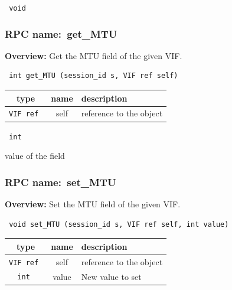 \vspace{0.3cm}

{\tt 
void
}



\vspace{0.3cm}
\vspace{0.3cm}
\vspace{0.3cm}
\subsubsection{RPC name:~get\_MTU}

{\bf Overview:} 
Get the MTU field of the given VIF.

\begin{verbatim} int get_MTU (session_id s, VIF ref self)\end{verbatim}



 
\vspace{0.3cm}
\begin{tabular}{|c|c|p{7cm}|}
 \hline
{\bf type} & {\bf name} & {\bf description} \\ \hline
{\tt VIF ref } & self & reference to the object \\ \hline 

\end{tabular}

\vspace{0.3cm}

{\tt 
int
}


value of the field
\vspace{0.3cm}
\vspace{0.3cm}
\vspace{0.3cm}
\subsubsection{RPC name:~set\_MTU}

{\bf Overview:} 
Set the MTU field of the given VIF.

\begin{verbatim} void set_MTU (session_id s, VIF ref self, int value)\end{verbatim}



 
\vspace{0.3cm}
\begin{tabular}{|c|c|p{7cm}|}
 \hline
{\bf type} & {\bf name} & {\bf description} \\ \hline
{\tt VIF ref } & self & reference to the object \\ \hline 

{\tt int } & value & New value to set \\ \hline 

\end{tabular}


